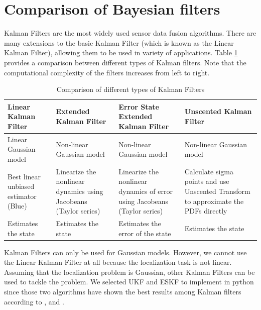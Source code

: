 \section{Comparison of Bayesian filters}
Kalman Filters are the most widely used sensor data fusion algorithms. There 
are many extensions to the basic Kalman Filter (which is known as the Linear Kalman Filter), allowing them to be used in variety of applications. Table \ref{table:ch:KalmanFilterComparison} provides a 
comparison between different types of Kalman filters. Note that the computational complexity of the filters increases from left to right.
\begin{table}[h]
	\centering
	\begin{tabular}{|p{3.4cm}|p{3.4cm}|p{3.4cm}|p{3.4cm}|} 
		\hline
		\textbf{Linear Kalman Filter} & \textbf{Extended Kalman Filter} & \textbf{Error State Extended Kalman Filter} & \textbf{Unscented Kalman Filter} \\
		\hline
		Linear Gaussian model&Non-linear Gaussian model&Non-linear  Gaussian model&Non-linear Gaussian model\\
		\hline
		Best linear unbiased estimator (Blue)&Linearize the nonlinear dynamics using Jacobeans (Taylor series)&Linearize the nonlinear 
		dynamics of error using Jacobeans (Taylor series)&Calculate sigma points and use Unscented Transform to approximate the \gls{PDF}s directly\\
		\hline
		Estimates the state & Estimates the state& Estimates the error of the state & Estimates the state\\
		\hline
	\end{tabular}
	\caption{Comparison of different types of Kalman Filters}
	\label{table:ch:KalmanFilterComparison}
\end{table}

Kalman Filters can only be used for Gaussian models. However, we cannot use the Linear Kalman Filter at all because the localization task is not linear. Assuming that the localization problem is Gaussian, other Kalman Filters can be used to tackle the problem. We selected  \gls{UKF} and \gls{ESKF} to implement in python since those two algorithms have shown the best results among Kalman filters according to \cite{ch24:st2004comparison},\cite{ch25:madyastha2011extended} and \cite{ch26:wan2000unscented}.

